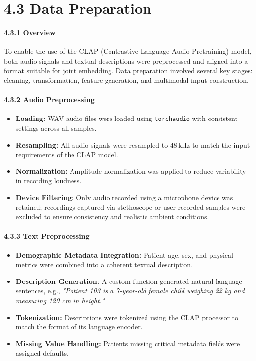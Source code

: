 \section*{4.3 Data Preparation}

\paragraph{4.3.1 Overview\\}
To enable the use of the CLAP (Contrastive Language-Audio Pretraining) model, both audio signals and textual descriptions were preprocessed and aligned into a format suitable for joint embedding. Data preparation involved several key stages: cleaning, transformation, feature generation, and multimodal input construction.

\paragraph{4.3.2 Audio Preprocessing\\}
\begin{itemize}
    \item \textbf{Loading:} WAV audio files were loaded using \texttt{torchaudio} with consistent settings across all samples.
    \item \textbf{Resampling:} All audio signals were resampled to 48\,kHz to match the input requirements of the CLAP model.
    \item \textbf{Normalization:} Amplitude normalization was applied to reduce variability in recording loudness.
    \item \textbf{Device Filtering:} Only audio recorded using a microphone device was retained; recordings captured via stethoscope or user-recorded samples were excluded to ensure consistency and realistic ambient conditions.
\end{itemize}

\paragraph{4.3.3 Text Preprocessing\\}
\begin{itemize}
    \item \textbf{Demographic Metadata Integration:} Patient age, sex, and physical metrics were combined into a coherent textual description.
    \item \textbf{Description Generation:} A custom function generated natural language sentences, e.g., \textit{"Patient 103 is a 7-year-old female child weighing 22 kg and measuring 120 cm in height."}
    \item \textbf{Tokenization:} Descriptions were tokenized using the CLAP processor to match the format of its language encoder.
    \item \textbf{Missing Value Handling:} Patients missing critical metadata fields were assigned defaults.
\end{itemize}

